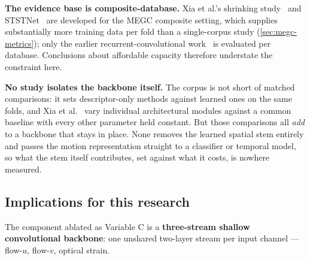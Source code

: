 \textbf{The evidence base is composite-database.} Xia et al.'s shrinking study~\cite{xia2020b} and STSTNet~\cite{liong2019b} are developed for the MEGC composite setting, which supplies substantially more training data per fold than a single-corpus study (\autoref{sec:megc-metrics}); only the earlier recurrent-convolutional work~\cite{xia2020a} is evaluated per database. Conclusions about affordable capacity therefore understate the constraint here.

\textbf{No study isolates the backbone itself.} The corpus is not short of matched comparisons: it sets descriptor-only methods against learned ones on the same folds, and Xia et al.~\cite{xia2020b} vary individual architectural modules against a common baseline with every other parameter held constant. But those comparisons all \textit{add} to a backbone that stays in place. None removes the learned spatial stem entirely and passes the motion representation straight to a classifier or temporal model, so what the stem itself contributes, set against what it costs, is nowhere measured.

\subsection{Implications for this research}
\label{sec:cnn-implications}

The component ablated as Variable C is a \textbf{three-stream shallow convolutional backbone}: one unshared two-layer stream per input channel --- flow-$u$, flow-$v$, optical strain.

